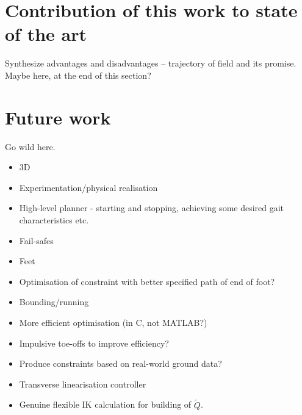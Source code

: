 \section{Contribution of this work to state of the art}
Synthesize advantages and disadvantages -- trajectory of field and its promise. Maybe here, at the end of this section?

\section{Future work}
Go wild here.

\begin{itemize}
	\item 3D
	\item Experimentation/physical realisation
	\item High-level planner - starting and stopping, achieving some desired gait characteristics etc.
	\item Fail-safes
	\item Feet
	\item Optimisation of constraint with better specified path of end of foot?
	\item Bounding/running
	\item More efficient optimisation (in C, not MATLAB?)
	\item Impulsive toe-offs to improve efficiency?
	\item Produce constraints based on real-world ground data?
	\item Transverse linearisation controller
	\item Genuine flexible IK calculation for building of $\tilde{Q}$.
\end{itemize}